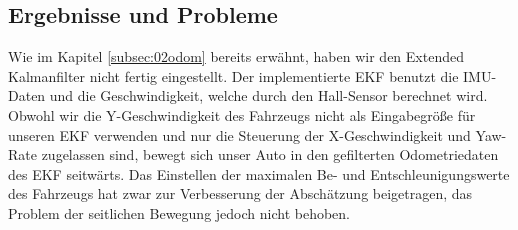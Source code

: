 \subsection{Ergebnisse und Probleme}
\label{subsec:02ergebnisse}
Wie im Kapitel \ref{subsec:02odom} bereits erw\"ahnt, haben wir den Extended Kalmanfilter nicht fertig eingestellt. Der implementierte EKF benutzt die IMU-Daten und die Geschwindigkeit, welche durch den Hall-Sensor berechnet wird. Obwohl wir die Y-Geschwindigkeit des Fahrzeugs nicht als Eingabegr\"o{\ss}e f\"ur unseren EKF verwenden und nur die Steuerung der X-Geschwindigkeit und Yaw-Rate zugelassen sind, bewegt sich unser Auto in den gefilterten Odometriedaten des EKF seitw\"arts. Das Einstellen der maximalen Be- und Entschleunigungswerte des Fahrzeugs hat zwar zur Verbesserung der Absch\"atzung beigetragen, das Problem der seitlichen Bewegung jedoch nicht behoben.